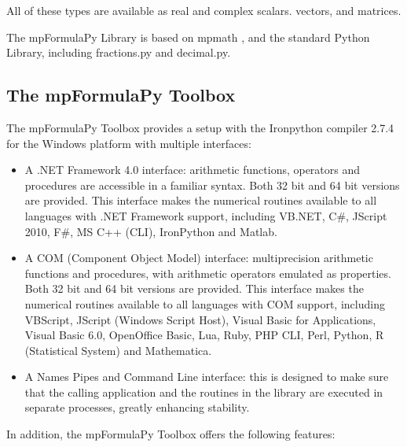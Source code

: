 All of these types are available as real and complex scalars. vectors, and matrices.

\vpara
The mpFormulaPy Library is based on mpmath \cite{mpmath}, and the standard Python Library, including fractions.py and decimal.py.
	
\subsection{The mpFormulaPy Toolbox}	
The mpFormulaPy Toolbox provides a setup with the Ironpython compiler 2.7.4 for the Windows platform with multiple interfaces:

\begin{itemize}	
\item A .NET Framework 4.0 interface: arithmetic functions, operators and procedures are accessible in a familiar syntax. Both 32 bit and 64 bit versions are provided. This interface makes the numerical routines available to all languages with .NET Framework support, including VB.NET, C\#, JScript 2010, F\#, MS C++ (CLI), IronPython and Matlab.
\item A COM (Component Object Model) interface: multiprecision arithmetic functions and procedures, with arithmetic operators emulated as properties. Both 32 bit and 64 bit versions are provided. This interface makes the numerical routines available to all languages with COM support, including VBScript, JScript (Windows Script Host), Visual Basic for Applications, Visual Basic 6.0, OpenOffice  Basic, Lua, Ruby, PHP CLI, Perl, Python, R (Statistical System) and Mathematica.
\item A Names Pipes and Command Line interface: this is designed to make sure that the calling application and the routines in the library are executed in separate processes, greatly enhancing stability. 

\end{itemize}
	
In addition, the mpFormulaPy Toolbox offers the following features:	
	
